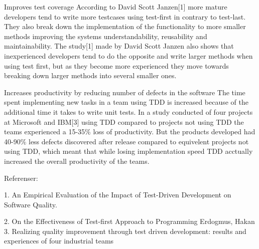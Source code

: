 Improves test coverage
According to David Scott Janzen[1] more mature developers tend to write more testcases using test-first in contrary to test-last. They also break down the implementation of the functionality to more smaller methods improving the systems understandability, reusability and maintainability. The study[1] made by David Scott Janzen also shows that inexperienced developers tend to do the opposite and write larger methods when using test first, but as they become more experienced they move towards breaking down larger methods into several smaller ones.

Increases productivity by reducing number of defects in the software
The time spent implementing new tasks in a team using TDD is increased because of the additional time it takes to write unit tests. In a study conducted of four projects at Microsoft and IBM[3] using TDD compared to projects not using TDD the teams experienced a 15-35\% loss of productivity. But the products developed had 40-90\% less defects discovered after release compared to equivelent projects not using TDD, which meant that while losing implementation speed TDD acctually increased the overall productivity of the teams.

Referenser:

1. 	An Empirical Evaluation of the Impact of
	Test-Driven Development on Software Quality.

2.	On the Effectiveness of Test-first Approach to Programming
	Erdogmus, Hakan
3.	Realizing quality improvement through test driven
	development: results and experiences of four industrial
	teams



